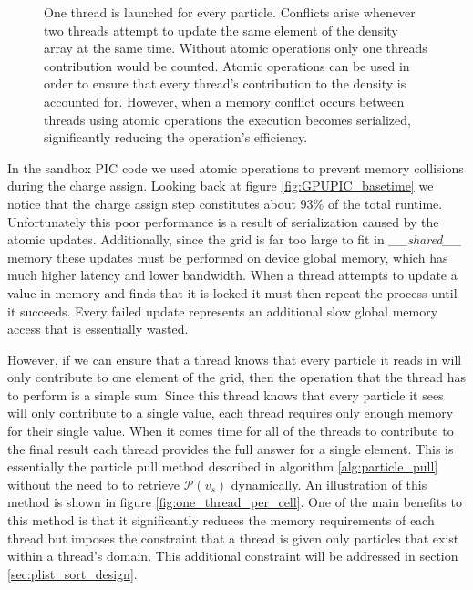 \begin{figure}
\begin{center}

\end{center}
\caption[Density Accumulation Memory Collisions]{One thread is launched for every particle. Conflicts arise whenever two threads attempt to update the same element of the density array at the same time. Without atomic operations only one threads contribution would be counted.  Atomic operations can be used in order to ensure that every thread's contribution to the density is accounted for. However, when a memory conflict occurs between threads using atomic operations the execution becomes serialized, significantly reducing the operation's efficiency.}
\label{fig:atomic_memory_collisions}
\end{figure}

In the sandbox PIC code we used atomic operations to prevent memory collisions during the charge assign. Looking back at figure \ref{fig:GPUPIC_basetime} we notice that the charge assign step constitutes about 93\% of the total runtime.  Unfortunately this poor performance is a result of serialization caused by the atomic updates. Additionally, since the grid is far too large to fit in \emph{\_\_shared\_\_} memory these updates must be performed on device global memory, which has much higher latency and lower bandwidth. When a thread attempts to update a value in memory and finds that it is locked it must then repeat the process until it succeeds. Every failed update represents an additional slow global memory access that is essentially wasted.




However, if we can ensure that a thread knows that every particle it reads in will only contribute to one element of the grid, then the operation that the thread has to perform is a simple sum.
Since this thread knows that every particle it sees will only contribute to a single value, each thread requires only enough memory for their single value. 
When it comes time for all of the threads to contribute to the final result each thread provides the full answer for a single element. 
This is essentially the particle pull method described in algorithm \ref{alg:particle_pull} without the need to to retrieve $\mathcal{P}(v_s)$ dynamically. An illustration of this method is shown in figure \ref{fig:one_thread_per_cell}.
One of the main benefits to this method is that it significantly reduces the memory requirements of each thread but imposes the constraint that a thread is given only particles that exist within a thread's domain. This additional constraint will be addressed in section \ref{sec:plist_sort_design}. 

